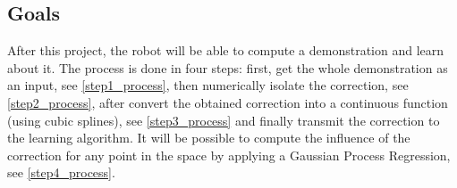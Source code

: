 \subsection{Goals}

After this project, the robot will be able to compute a demonstration and learn about it. The process is done in four steps: first, get the whole demonstration as an input, see \autoref{step1_process}, then numerically isolate the correction, see \autoref{step2_process}, after convert the obtained correction into a continuous function (using cubic splines), see \autoref{step3_process} and finally transmit the correction to the learning algorithm. It will be possible to compute the influence of the correction for any point in the space by applying a Gaussian Process Regression, see \autoref{step4_process}.

